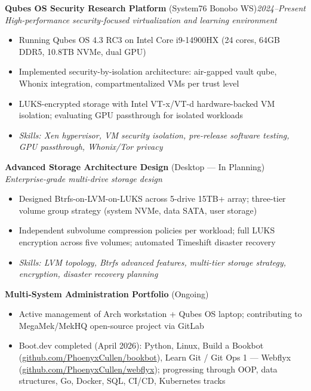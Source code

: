 \documentclass[9pt,letterpaper]{extarticle}
\begin{document}
\noindent\textbf{Qubes OS Security Research Platform} (System76 Bonobo WS)\hfill\textit{2024--Present}\\
\textit{High-performance security-focused virtualization and learning environment}
\begin{itemize}
  \item Running Qubes OS 4.3 RC3 on Intel Core i9-14900HX (24 cores, 64GB DDR5, 10.8TB NVMe, dual GPU)
  \item Implemented security-by-isolation architecture: air-gapped vault qube, Whonix integration, compartmentalized VMs per trust level
  \item LUKS-encrypted storage with Intel VT-x/VT-d hardware-backed VM isolation; evaluating GPU passthrough for isolated workloads
  \item \textit{Skills: Xen hypervisor, VM security isolation, pre-release software testing, GPU passthrough, Whonix/Tor privacy}
\end{itemize}

\vspace{4pt}
\noindent\textbf{Advanced Storage Architecture Design} (Desktop --- In Planning)\\
\textit{Enterprise-grade multi-drive storage design}
\begin{itemize}
  \item Designed Btrfs-on-LVM-on-LUKS across 5-drive 15TB+ array; three-tier volume group strategy (system NVMe, data SATA, user storage)
  \item Independent subvolume compression policies per workload; full LUKS encryption across five volumes; automated Timeshift disaster recovery
  \item \textit{Skills: LVM topology, Btrfs advanced features, multi-tier storage strategy, encryption, disaster recovery planning}
\end{itemize}

\vspace{4pt}
\noindent\textbf{Multi-System Administration Portfolio} (Ongoing)
\begin{itemize}
  \item Active management of Arch workstation + Qubes OS laptop; contributing to MegaMek/MekHQ open-source project via GitLab
  \item Boot.dev completed (April 2026): Python, Linux, Build a Bookbot (\href{https://github.com/PhoenyxCullen/bookbot}{github.com/PhoenyxCullen/bookbot}), Learn Git / Git Ops 1 --- Webflyx (\href{https://github.com/PhoenyxCullen/webflyx}{github.com/PhoenyxCullen/webflyx}); progressing through OOP, data structures, Go, Docker, SQL, CI/CD, Kubernetes tracks
\end{itemize}
\end{document}
